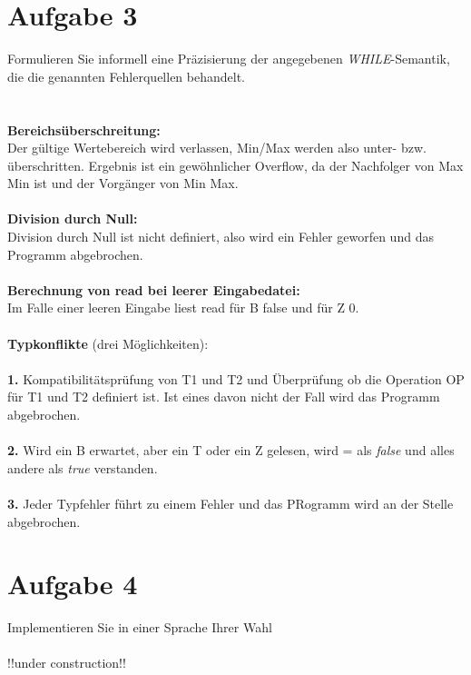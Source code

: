 \documentclass[ngerman,a4paper]{report}
\begin{document}
\section*{Aufgabe 3}
Formulieren Sie informell eine Präzisierung der angegebenen \emph{WHILE}-Semantik, die die genannten Fehlerquellen behandelt.\\\\\\
\textbf{Bereichsüberschreitung:}\\
Der gültige Wertebereich wird verlassen, Min/Max werden also unter- bzw. überschritten. Ergebnis ist ein gewöhnlicher Overflow, da der Nachfolger von Max Min ist und der Vorgänger von Min Max.\\\\
\textbf{Division durch Null:}\\
Division durch Null ist nicht definiert, also wird ein Fehler geworfen und das Programm abgebrochen.\\\\
\textbf{Berechnung von read bei leerer Eingabedatei:}\\
Im Falle einer leeren Eingabe liest read für B false und für Z 0.\\\\
\textbf{Typkonflikte} (drei Möglichkeiten):\\\\
\textbf{1.}
Kompatibilitätsprüfung von T1 und T2 und Überprüfung ob die Operation OP für T1 und T2 definiert ist. Ist eines davon nicht der Fall wird das Programm abgebrochen.\\\\
\textbf{2.}
Wird ein B erwartet, aber ein T oder ein Z gelesen, wird = als \textit{false} und alles andere als \textit{true} verstanden.\\\\
\textbf{3.} Jeder Typfehler führt zu einem Fehler und das PRogramm wird an der Stelle abgebrochen.

\section*{Aufgabe 4}
Implementieren Sie in einer Sprache Ihrer Wahl\\\\
!!under construction!!
\end{document}
